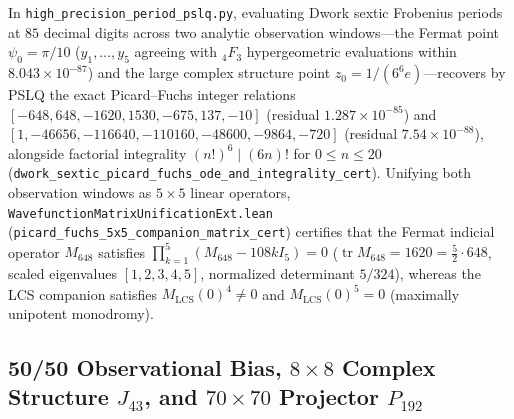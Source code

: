 \documentclass[11pt,a4paper]{article}
\begin{document}
In \texttt{high\_\allowbreak{}precision\_\allowbreak{}period\_\allowbreak{}pslq.py}, evaluating Dwork sextic Frobenius periods at $85$ decimal digits across two analytic observation windows---the Fermat point $\psi_0 = \pi/10$ ($y_1,\dots,y_5$ agreeing with ${}_4F_3$ hypergeometric evaluations within $8.043\times 10^{-87}$) and the large complex structure point $z_0 = 1/(6^6 e)$---recovers by PSLQ the exact Picard--Fuchs integer relations $[-648,\allowbreak 648,\allowbreak -1620,\allowbreak 1530,\allowbreak -675,\allowbreak 137,\allowbreak -10]$ (residual $1.287\times 10^{-85}$) and $[1,\allowbreak -46656,\allowbreak -116640,\allowbreak -110160,\allowbreak -48600,\allowbreak -9864,\allowbreak -720]$ (residual $7.54\times 10^{-88}$), alongside factorial integrality $(n!)^6 \mid (6n)!$ for $0 \le n \le 20$ (\texttt{dwork\_\allowbreak{}sextic\_\allowbreak{}picard\_\allowbreak{}fuchs\_\allowbreak{}ode\_\allowbreak{}and\_\allowbreak{}integrality\_\allowbreak{}cert}). Unifying both observation windows as $5\times 5$ linear operators, \texttt{Wavefunction\allowbreak{}Matrix\allowbreak{}Unification\allowbreak{}Ext.lean} (\texttt{picard\_\allowbreak{}fuchs\_\allowbreak{}5x5\_\allowbreak{}companion\_\allowbreak{}matrix\_\allowbreak{}cert}) certifies that the Fermat indicial operator $M_{648}$ satisfies $\prod_{k=1}^5 (M_{648} - 108 k I_5) = 0$ ($\operatorname{tr} M_{648} = 1620 = \tfrac{5}{2}\cdot 648$, scaled eigenvalues $[1,2,3,4,5]$, normalized determinant $5/324$), whereas the LCS companion satisfies $M_{\mathrm{LCS}}(0)^4 \neq 0$ and $M_{\mathrm{LCS}}(0)^5 = 0$ (maximally unipotent monodromy).

\subsection{50/50 Observational Bias, $8\times 8$ Complex Structure $J_{43}$, and $70\times 70$ Projector $P_{192}$}
\end{document}
